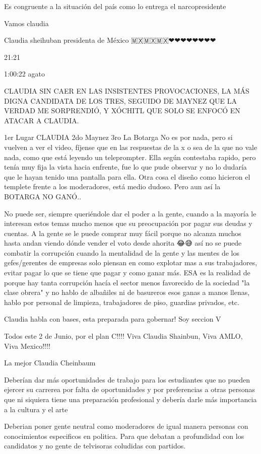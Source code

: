 Es congruente a la situación del país como lo entrega el narcopresidente

Vamos claudia 💪

Claudia sheihuban presidenta de México 🇲🇽🇲🇽🇲🇽❤❤❤❤❤❤❤❤

21:21

1:00:22 agato

CLAUDIA SIN CAER EN LAS INSISTENTES PROVOCACIONES, LA MÁS DIGNA CANDIDATA DE LOS TRES, SEGUIDO DE MAYNEZ QUE LA VERDAD ME SORPRENDIÓ, Y XÓCHITL QUE SOLO SE ENFOCÓ EN ATACAR A CLAUDIA.

1er  Lugar CLAUDIA
2do Maynez
3ro  La Botarga
No es por nada, pero si vuelven a ver el video, fíjense que en las respuestas de la x o sea de la que no vale nada, como que está leyendo un teleprompter.
Ella según contestaba rapido, pero tenía muy fija la vista hacia enfrente, fue lo que pude observar y no lo dudaría que le hayan tenido una pantalla para ella.
Otra cosa el diseño como hicieron el templete frente a los moderadores, está medio dudoso.
Pero aun así la BOTARGA NO GANÓ..

No puede ser, siempre queriéndole dar el poder a la gente, cuando a la mayoría le interesan estos temas mucho menos que su  preocupación por pagar sus deudas y cuentas. A la gente se le puede comprar muy fácil porque no alcanza muchos hasta andan viendo dónde vender el voto desde ahorita 😂😅 así no se puede combatir la corrupción cuando la mentalidad de la gente y las mentes de los gefes/gerentes de empresas solo piensan en como explotar mas a sus trabajadores, evitar pagar lo que se tiene que pagar y como ganar más. ESA es la realidad de porque hay tanta corrupción hacía el sector menos favorecido de la sociedad "la clase obrera" y no hablo de albañiles ni de basureros esos ganas a manos llenas, hablo por personal de limpieza, trabajadores de piso, guardias privados, etc.

Claudia habla con bases,  esta preparada para gobernar! Soy seccion V

Todos este 2 de Junio, por el plan C!!!!  Viva Claudia Shainbun,  Viva AMLO,  Viva Mexico!!!!

La mejor Claudia Cheinbaum 👏👏👏

Deberían dar más oportunidades de trabajo para los estudiantes que no pueden ejercer su carrerea por falta de oportunidades y por preferencias a otras personas que ni siquiera tiene una preparación profesional y debería darle más importancia a la cultura y el arte

Deberian poner gente neutral como moderadores de igual manera personas con conocimientos especificos en politica. Para que debatan a profundidad con los candidatos y no gente de telvisoras coludidas con partidos.

